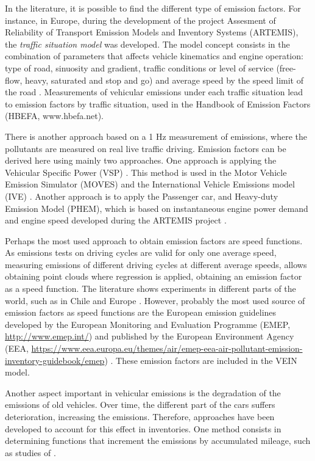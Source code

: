 \documentclass[12pt,graybox,envcountchap,sectrefs]{krantz}
\theoremstyle{definition}
\theoremstyle{definition}
\theoremstyle{definition}
\theoremstyle{remark}
\begin{document}
In the literature, it is possible to find the different type of emission
factors. For instance, in Europe, during the development of the project
Assesment of Reliability of Transport Emission Models and Inventory
Systems (ARTEMIS), the \emph{traffic situation model} was developed. The
model concept consists in the combination of parameters that affects
vehicle kinematics and engine operation: type of road, sinuosity and
gradient, traffic conditions or level of service (free-flow, heavy,
saturated and stop and go) and average speed by the speed limit of the
road \citep{artemis}. Measurements of vehicular emissions under each
traffic situation lead to emission factors by traffic situation, used in
the Handbook of Emission Factors (HBEFA, www.hbefa.net).

There is another approach based on a 1 Hz measurement of emissions,
where the pollutants are measured on real live traffic driving. Emission
factors can be derived here using mainly two approaches. One approach is
applying the Vehicular Specific Power (VSP) \citep{jimenez1999vehicle}.
This method is used in the Motor Vehicle Emission Simulator (MOVES)
\citep{koupal2003design} and the International Vehicle Emissions model
(IVE) \citep{Davisetal2005}. Another approach is to apply the Passenger
car, and Heavy-duty Emission Model (PHEM), which is based on
instantaneous engine power demand and engine speed developed during the
ARTEMIS project \citep[\citet{artemis}]{tim}.

Perhaps the most used approach to obtain emission factors are speed
functions. As emissions tests on driving cycles are valid for only one
average speed, measuring emissions of different driving cycles at
different average speeds, allows obtaining point clouds where regression
is applied, obtaining an emission factor as a speed function. The
literature shows experiments in different parts of the world, such as in
Chile \citep{Corvalanetal2002} and Europe
\citep{ntziachristos2000speed}. However, probably the most used source
of emission factors as speed functions are the European emission
guidelines developed by the European Monitoring and Evaluation Programme
(EMEP, \url{http://www.emep.int/}) and published by the European
Environment Agency (EEA,
\url{https://www.eea.europa.eu/themes/air/emep-eea-air-pollutant-emission-inventory-guidebook/emep})
\citep{NtziachristosSamaras2016}. These emission factors are included in
the VEIN model.

Another aspect important in vehicular emissions is the degradation of
the emissions of old vehicles. Over time, the different part of the cars
suffers deterioration, increasing the emissions. Therefore, approaches
have been developed to account for this effect in inventories. One
method consists in determining functions that increment the emissions by
accumulated mileage, such as studies of \citet{CorvalanVargas2003}.
\end{document}
